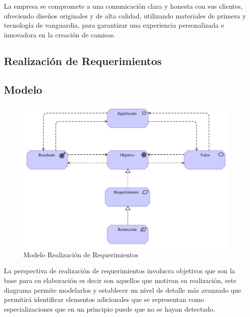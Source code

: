 La empresa se compromete a una comunicación clara y honesta con sus clientes, ofreciendo diseños originales y de alta calidad, utilizando materiales de primera y tecnología de vanguardia, para garantizar una experiencia personalizada e innovadora en la creación de camisas.
 
\begin{center}
  \begin{minipage}{1\textwidth}
\section{Realización de Requerimientos}

\subsection{Modelo}

\begin{figure}[H]
	\centering	
    \includegraphics[width=0.9\linewidth]{imgs/Modelo 5.pdf}
	\caption{Modelo Realización de Requerimientos}
\end{figure}


 La perspectiva de realización de requerimientos involucra objetivos que son la base para su elaboración es decir son aquellos que motivan su realización, este diagrama permite modelarlos y establecer un nivel de detalle más avanzado que permitirá identificar elementos adicionales que se representan como especializaciones 
 que en un principio puede que no se hayan detectado.

\end{minipage}
\end{center}
